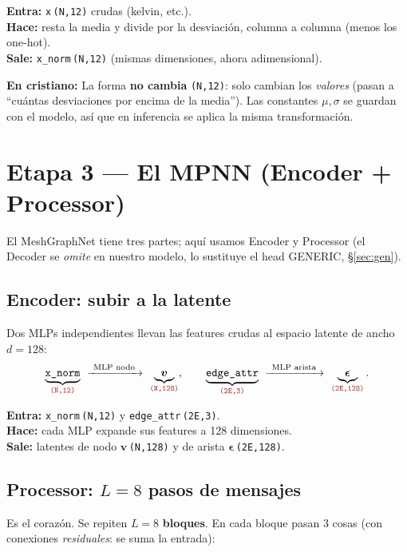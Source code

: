 \documentclass[11pt]{article}
\newcommand{\shp}[1]{{\color{shapecol}\texttt{(#1)}}}   %
\theoremstyle{definition}
\newcommand{\dummies}[1]{%
  \par\smallskip\noindent
  \colorbox{yellow!18}{\parbox{\dimexpr\linewidth-2\fboxsep}{%
  \small\textbf{En cristiano:} #1}}\par\smallskip}
\newcommand{\io}[3]{%
  \par\smallskip\noindent
  \colorbox{blue!6}{\parbox{\dimexpr\linewidth-2\fboxsep}{\small
  \textbf{Entra:} #1 \\ \textbf{Hace:} #2 \\ \textbf{Sale:} #3}}\par\smallskip}
\begin{document}
\io{\texttt{x}\,\shp{N,12} crudas (kelvin, etc.).}
{resta la media y divide por la desviación, columna a columna (menos los one-hot).}
{\texttt{x\_norm}\,\shp{N,12} (mismas dimensiones, ahora adimensional).}

\dummies{La forma \textbf{no cambia} \shp{N,12}: solo cambian los \emph{valores}
(pasan a ``cuántas desviaciones por encima de la media''). Las constantes $\mu,\sigma$
se guardan con el modelo, así que en inferencia se aplica la misma transformación.}

\section{Etapa 3 — El MPNN (Encoder + Processor)}
\label{sec:mpnn}

El MeshGraphNet tiene tres partes; aquí usamos Encoder y Processor (el Decoder se
\emph{omite} en nuestro modelo, lo sustituye el head GENERIC, §\ref{sec:gen}).

\subsection{Encoder: subir a la latente}
Dos MLPs independientes llevan las features crudas al espacio latente de ancho
$d{=}128$:
\[
  \underbrace{\texttt{x\_norm}}_{\shp{N,12}}\ \xrightarrow{\ \text{MLP nodo}\ }\
  \underbrace{\bm v}_{\shp{N,128}},
  \qquad
  \underbrace{\texttt{edge\_attr}}_{\shp{2E,3}}\ \xrightarrow{\ \text{MLP arista}\ }\
  \underbrace{\bm\epsilon}_{\shp{2E,128}}.
\]
\io{\texttt{x\_norm}\,\shp{N,12} y \texttt{edge\_attr}\,\shp{2E,3}.}
{cada MLP expande sus features a 128 dimensiones.}
{latentes de nodo $\bm v$\,\shp{N,128} y de arista $\bm\epsilon$\,\shp{2E,128}.}

\subsection{Processor: $L{=}8$ pasos de mensajes}
Es el corazón. Se repiten $L{=}8$ \textbf{bloques}. En cada bloque pasan 3 cosas
(con conexiones \emph{residuales}: se suma la entrada):

\begin{center}
\end{center}
\end{document}
